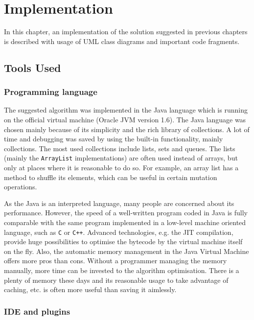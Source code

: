 \chapter{Implementation}
\label{sec:implementation}

In this chapter, an implementation of the solution suggested in previous chapters is described with usage of UML class diagrams and important code fragments.

\section{Tools Used}

\subsection{Programming language}

The suggested algorithm was implemented in the Java language which is running on the official virtual machine (Oracle JVM version 1.6). The Java language was chosen mainly because of its simplicity and the rich library of collections. A lot of time and debugging was saved by using the built-in functionality, mainly collections. The most used collections include lists, sets and queues. The lists (mainly the {\tt ArrayList} implementations) are often used instead of arrays, but only at places where it is reasonable to do so. For example, an array list has a method to shuffle its elements, which can be useful in certain mutation operations.

As the Java is an interpreted language, many people are concerned about its performance. However, the speed of a well-written program coded in Java is fully comparable with the same program implemented in a low-level machine oriented language, such as {\tt C} or {\tt C++}. Advanced technologies, e.g. the JIT compilation, provide huge possibilities to optimise the bytecode by the virtual machine itself on the fly. Also, the automatic memory management in the Java Virtual Machine offers more pros than cons. Without a programmer managing the memory manually, more time can be invested to the algorithm optimisation. There is a plenty of memory these days and its reasonable usage to take advantage of caching, etc. is often more useful than saving it aimlessly.

\subsection{IDE and plugins}

